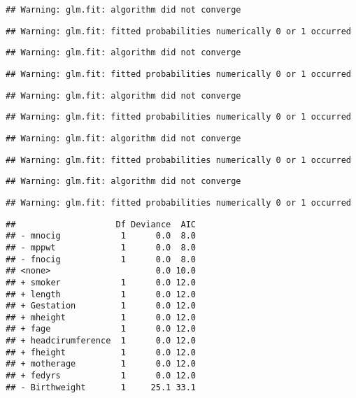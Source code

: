 \documentclass[]{article}
\begin{document}
\begin{verbatim}
## Warning: glm.fit: algorithm did not converge
\end{verbatim}

\begin{verbatim}
## Warning: glm.fit: fitted probabilities numerically 0 or 1 occurred
\end{verbatim}

\begin{verbatim}
## Warning: glm.fit: algorithm did not converge
\end{verbatim}

\begin{verbatim}
## Warning: glm.fit: fitted probabilities numerically 0 or 1 occurred
\end{verbatim}

\begin{verbatim}
## Warning: glm.fit: algorithm did not converge
\end{verbatim}

\begin{verbatim}
## Warning: glm.fit: fitted probabilities numerically 0 or 1 occurred
\end{verbatim}

\begin{verbatim}
## Warning: glm.fit: algorithm did not converge
\end{verbatim}

\begin{verbatim}
## Warning: glm.fit: fitted probabilities numerically 0 or 1 occurred
\end{verbatim}

\begin{verbatim}
## Warning: glm.fit: algorithm did not converge
\end{verbatim}

\begin{verbatim}
## Warning: glm.fit: fitted probabilities numerically 0 or 1 occurred
\end{verbatim}

\begin{verbatim}
##                    Df Deviance  AIC
## - mnocig            1      0.0  8.0
## - mppwt             1      0.0  8.0
## - fnocig            1      0.0  8.0
## <none>                     0.0 10.0
## + smoker            1      0.0 12.0
## + length            1      0.0 12.0
## + Gestation         1      0.0 12.0
## + mheight           1      0.0 12.0
## + fage              1      0.0 12.0
## + headcirumference  1      0.0 12.0
## + fheight           1      0.0 12.0
## + motherage         1      0.0 12.0
## + fedyrs            1      0.0 12.0
## - Birthweight       1     25.1 33.1
\end{verbatim}
\end{document}
